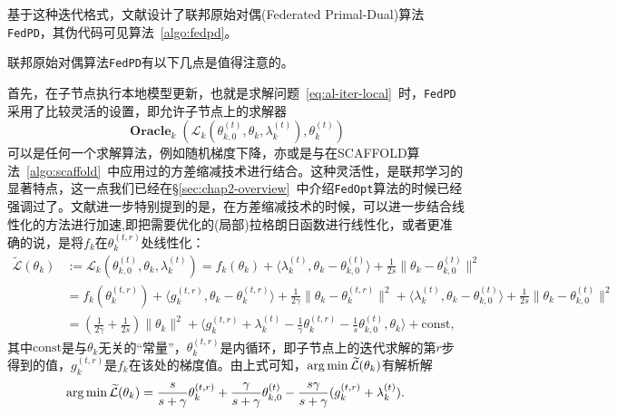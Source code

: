 基于这种迭代格式，文献\parencite{zhang2020fedpd}设计了联邦原始对偶(Federated Primal-Dual)算法\texttt{FedPD}，其伪代码可见算法~\ref{algo:fedpd}。



联邦原始对偶算法\texttt{FedPD}有以下几点是值得注意的。

首先，在子节点执行本地模型更新，也就是求解问题~\eqref{eq:al-iter-local}~时，\texttt{FedPD}采用了比较灵活的设置，即允许子节点上的求解器
\begin{equation*}
\operatorname{\mathbf{Oracle}}_k(\mathcal{L}_k(\theta_{k, 0}^{(t)}, \theta_k, \lambda_k^{(t)}), \theta_k^{(t)})
\end{equation*}
可以是任何一个求解算法，例如随机梯度下降，亦或是与在SCAFFOLD算法~\ref{algo:scaffold}~中应用过的方差缩减技术进行结合。这种灵活性，是联邦学习的显著特点，这一点我们已经在\S\ref{sec:chap2-overview}~中介绍\texttt{FedOpt}算法的时候已经强调过了。文献\parencite{zhang2020fedpd}进一步特别提到的是，在方差缩减技术的时候，可以进一步结合线性化的方法进行加速,即把需要优化的(局部)拉格朗日函数进行线性化，或者更准确的说，是将$f_k$在$\theta_{k}^{(t,r)}$处线性化：
\begin{equation*}
\begin{aligned}
\widetilde{\mathcal{L}}(\theta_{k}) & := \mathcal{L}_k(\theta_{k, 0}^{(t)}, \theta_k, \lambda_k^{(t)}) = f_k(\theta_k) + \langle \lambda_k^{(t)}, \theta_k - \theta_{k, 0}^{(t)} \rangle + \frac{1}{2s} \lVert \theta_k - \theta_{k, 0}^{(t)} \rVert^2 \\
& = f_k(\theta_k^{(t,r)}) + \langle g_k^{(t,r)}, \theta_k - \theta_k^{(t,r)} \rangle + \frac{1}{2\gamma} \lVert \theta_k - \theta_k^{(t,r)} \rVert^2 + \langle \lambda_k^{(t)}, \theta_k - \theta_{k, 0}^{(t)} \rangle + \frac{1}{2s} \lVert \theta_k - \theta_{k, 0}^{(t)} \rVert^2 \\
& = (\frac{1}{2\gamma} + \frac{1}{2s}) \lVert \theta_k \rVert^2 + \langle g_k^{(t,r)} + \lambda_k^{(t)} - \frac{1}{\gamma} \theta_k^{(t,r)} - \frac{1}{s} \theta_{k, 0}^{(t)}, \theta_k \rangle + \text{const},
\end{aligned}
\end{equation*}
其中$\text{const}$是与$\theta_k$无关的``常量''，$\theta_{k}^{(t,r)}$是内循环，即子节点上的迭代求解的第$r$步得到的值，$g_k^{(t,r)}$是$f_k$在该处的梯度值。由上式可知，$\operatorname*{arg\,min} \widetilde{\mathcal{L}}(\theta_{k})$有解析解
\begin{equation*}
\operatorname*{arg\,min} \widetilde{\mathcal{L}}(\theta_{k}) = \frac{s}{s+\gamma} \theta_k^{(t,r)} + \frac{\gamma}{s+\gamma} \theta_{k, 0}^{(t)} - \frac{s\gamma}{s+\gamma}(g_k^{(t,r)} + \lambda_k^{(t)}).
\end{equation*}

